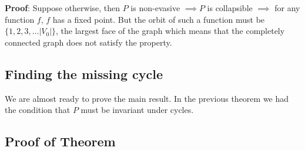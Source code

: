 \documentclass[letterpaper,12pt]{article}
\begin{document}
\textbf{Proof}: Suppose otherwise, then $P$ is non-evasive $\implies P$ is collapsible $\implies$ for any function $f$, $f$ has a fixed point. But the orbit of such a function must be $\{1, 2, 3, \ldots |V_0| \}$, the largest face of the graph which means that the completely connected graph does not satisfy the property.

\subsection{Finding the missing cycle}

We are almost ready to prove the main result. In the previous theorem we had the condition that $P$ must be invariant under cycles.

\subsection{Proof of Theorem}
\end{document}
